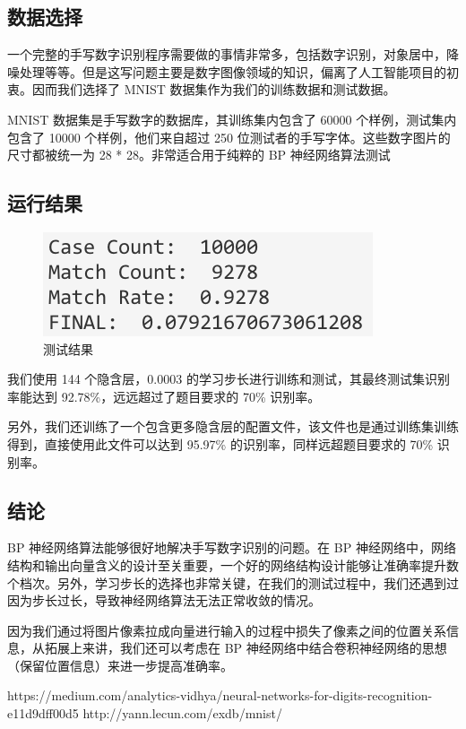 \subsection{数据选择}

一个完整的手写数字识别程序需要做的事情非常多，包括数字识别，对象居中，降噪处理等等。但是这写问题主要是数字图像领域的知识，偏离了人工智能项目的初衷。因而我们选择了 MNIST 数据集\cite{MNIST}作为我们的训练数据和测试数据。

MNIST 数据集是手写数字的数据库，其训练集内包含了 60000 个样例，测试集内包含了 10000 个样例，他们来自超过 250 位测试者的手写字体。这些数字图片的尺寸都被统一为 28 * 28。非常适合用于纯粹的 BP 神经网络算法测试

\subsection{运行结果}

\begin{figure}
    \centering
    \includegraphics{BP-Test.png}
    \caption{测试结果}
    \label{fig:BP Test}
\end{figure}


我们使用 144 个隐含层，0.0003 的学习步长进行训练和测试，其最终测试集识别率能达到 92.78\%，远远超过了题目要求的 70\% 识别率。

另外，我们还训练了一个包含更多隐含层的配置文件，该文件也是通过训练集训练得到，直接使用此文件可以达到 95.97\% 的识别率，同样远超题目要求的 70\% 识别率。

\subsection{结论}

BP 神经网络算法能够很好地解决手写数字识别的问题。在 BP 神经网络中，网络结构和输出向量含义的设计至关重要，一个好的网络结构设计能够让准确率提升数个档次。另外，学习步长的选择也非常关键，在我们的测试过程中，我们还遇到过因为步长过长，导致神经网络算法无法正常收敛的情况。

因为我们通过将图片像素拉成向量进行输入的过程中损失了像素之间的位置关系信息，从拓展上来讲，我们还可以考虑在 BP 神经网络中结合卷积神经网络的思想（保留位置信息）来进一步提高准确率。

\begin{thebibliography}{}
 https://medium.com/analytics-vidhya/neural-networks-for-digits-recognition-e11d9dff00d5
 http://yann.lecun.com/exdb/mnist/
\end{thebibliography}

